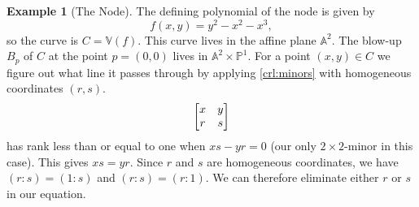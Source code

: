 \documentclass{article}
\theoremstyle{definition}
\newtheorem{example}{Example}
\newcommand{\A}{\mathbb{A}}
\newcommand{\V}{\mathbb{V}}
\renewcommand{\P}{\mathbb{P}}
\begin{document}
\begin{example}[The Node]
    The defining polynomial of the node is given by
    \begin{equation}
        \label{eq:node}
        f(x, y) = y^2 - x^2 - x^3,
    \end{equation}
    so the curve is $C = \V(f)$. This curve lives in the affine plane $\A^2$.
    The blow-up $B_p$ of $C$ at the point $p = (0, 0)$ lives in $\A^2 \times
    \P^1$. For a point $(x, y) \in C$ we figure out what line it passes through
    by applying \cref{crl:minors} with homogeneous coordinates $(r, s)$.
    \begin{equation}
        \notag
        \begin{bmatrix}
            x & y \\
            r & s
        \end{bmatrix}
    \end{equation}
    has rank less than or equal to one when $xs - yr = 0$ (our only
    $2\times2$-minor in this case). This gives $xs = yr$. Since $r$ and $s$ are
    homogeneous coordinates, we have $(r : s) = (1 : s)$ and $(r : s) = (r :
    1)$. We can therefore eliminate either $r$ or $s$ in our equation. 


\end{example}
\end{document}
